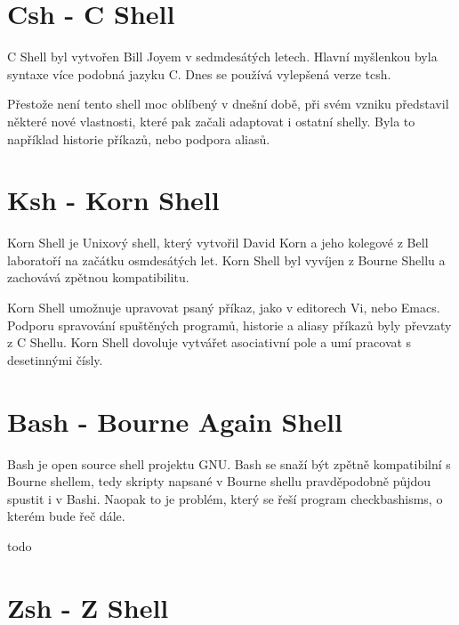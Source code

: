 \documentclass[thesis=M,czech]{FITthesis}[2012/06/26]
\begin{document}
%
%
%
\section{Csh - C Shell}

C Shell byl vytvořen Bill Joyem v sedmdesátých letech. Hlavní myšlenkou byla syntaxe více podobná jazyku C. Dnes se používá vylepšená verze tcsh.

Přestože není tento shell moc oblíbený v dnešní době, při svém vzniku představil některé nové vlastnosti, které pak začali adaptovat i ostatní shelly. Byla to například historie příkazů, nebo podpora aliasů.




%
%
%
\section{Ksh - Korn Shell}

Korn Shell je Unixový shell, který vytvořil David Korn a jeho kolegové z Bell laboratoří na začátku osmdesátých let. Korn Shell byl vyvíjen z Bourne Shellu a zachovává zpětnou kompatibilitu.

Korn Shell umožnuje upravovat psaný příkaz, jako v editorech Vi, nebo Emacs. Podporu spravování spuštěných programů, historie a aliasy příkazů byly převzaty z C Shellu. Korn Shell dovoluje vytvářet asociativní pole a umí pracovat s desetinnými čísly.


%
%
%
\section{Bash - Bourne Again Shell}

Bash je open source shell projektu GNU. Bash se snaží být zpětně kompatibilní s Bourne shellem, tedy skripty napsané v Bourne shellu pravděpodobně půjdou spustit i v Bashi. Naopak to je problém, který se řeší program checkbashisms, o kterém bude řeč dále.

todo



%
%
%
\section{Zsh - Z Shell}
\end{document}
